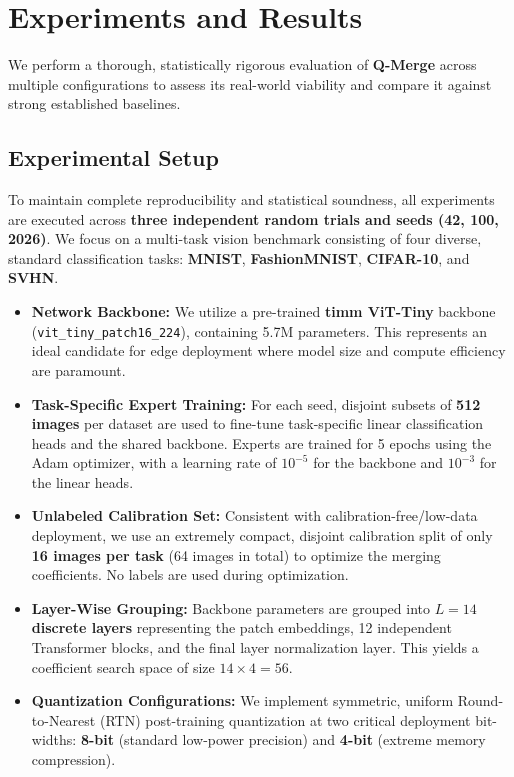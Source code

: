 \section{Experiments and Results}
\label{sec:experiments}

We perform a thorough, statistically rigorous evaluation of \textbf{Q-Merge} across multiple configurations to assess its real-world viability and compare it against strong established baselines.

\subsection{Experimental Setup}
To maintain complete reproducibility and statistical soundness, all experiments are executed across \textbf{three independent random trials and seeds (42, 100, 2026)}. We focus on a multi-task vision benchmark consisting of four diverse, standard classification tasks: \textbf{MNIST}, \textbf{FashionMNIST}, \textbf{CIFAR-10}, and \textbf{SVHN}.

\begin{itemize}
    \item \textbf{Network Backbone:} We utilize a pre-trained \textbf{timm ViT-Tiny} backbone (\texttt{vit\_tiny\_patch16\_224}), containing 5.7M parameters. This represents an ideal candidate for edge deployment where model size and compute efficiency are paramount.
    \item \textbf{Task-Specific Expert Training:} For each seed, disjoint subsets of \textbf{512 images} per dataset are used to fine-tune task-specific linear classification heads and the shared backbone. Experts are trained for 5 epochs using the Adam optimizer, with a learning rate of $10^{-5}$ for the backbone and $10^{-3}$ for the linear heads.
    \item \textbf{Unlabeled Calibration Set:} Consistent with calibration-free/low-data deployment, we use an extremely compact, disjoint calibration split of only \textbf{16 images per task} (64 images in total) to optimize the merging coefficients. No labels are used during optimization.
    \item \textbf{Layer-Wise Grouping:} Backbone parameters are grouped into \textbf{$L=14$ discrete layers} representing the patch embeddings, 12 independent Transformer blocks, and the final layer normalization layer. This yields a coefficient search space of size $14 \times 4 = 56$.
    \item \textbf{Quantization Configurations:} We implement symmetric, uniform Round-to-Nearest (RTN) post-training quantization at two critical deployment bit-widths: \textbf{8-bit} (standard low-power precision) and \textbf{4-bit} (extreme memory compression).
\end{itemize}

